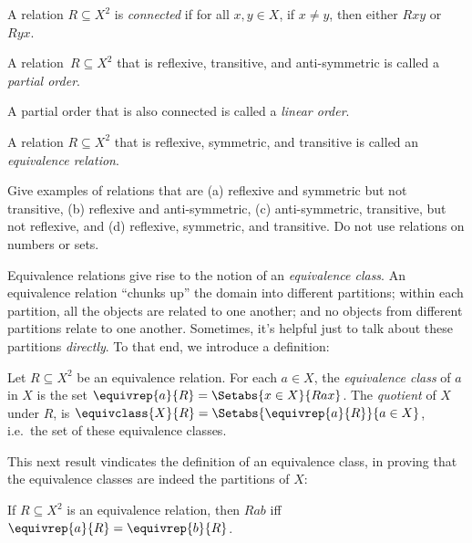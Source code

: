 \documentclass[../../../include/open-logic-section]{subfiles}
\begin{document}
\begin{defn}[Connectivity]
A relation $R \subseteq X^2$ is \emph{connected} if for all $x,y\in
X$, if $x \neq y$, then either $Rxy$ or~$Ryx$.
\end{defn}

\begin{defn}
A relation~$R \subseteq X^2$ that is reflexive, transitive, and
anti-symmetric is called a \emph{partial order}. 
\end{defn}

\begin{defn}
A partial order that is also connected is called a \emph{linear order}.
\end{defn}

\begin{defn}
A relation $R \subseteq X^2$ that is reflexive, symmetric, and
transitive is called an \emph{equivalence relation}.
\end{defn}\noindent
\begin{prob}
	Give examples of relations that are (a) reflexive and symmetric but
	not transitive, (b) reflexive and anti-symmetric, (c) anti-symmetric,
	transitive, but not reflexive, and (d) reflexive, symmetric, and
	transitive.  Do not use relations on numbers or sets.
\end{prob} 
Equivalence relations give rise to the notion of an \emph{equivalence class}. An equivalence relation ``chunks up'' the domain into different partitions; within each partition, all the objects are related to one another; and no objects from different partitions relate to one another. Sometimes, it's helpful just to talk about these partitions \emph{directly}. To that end, we introduce a definition:
\begin{defn}
	Let $R \subseteq X^2$ be an equivalence relation. For each $a \in X$, the \emph{equivalence class} of $a$ in $X$ is the set $\equivrep{a}{R} = \Setabs{x \in X}{Rax}$. The \emph{quotient} of $X$ under $R$, is $\equivclass{X}{R} = \Setabs{\equivrep{a}{R}}{a \in X}$, i.e.\ the set of these equivalence classes.
\end{defn}\noindent
This next result vindicates the definition of an equivalence class, in proving that the equivalence classes are indeed the partitions of $X$:
\begin{prop}
 	If $R \subseteq X^2$ is an equivalence relation, then $Rab$ iff $\equivrep{a}{R} = \equivrep{b}{R}$.
 \end{prop}
\end{document}
